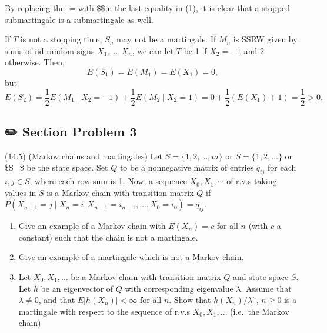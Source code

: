 \documentclass[
  letterpaper,
  DIV=11,
  numbers=noendperiod]{scrreprt}
\theoremstyle{definition}
\theoremstyle{plain}
\theoremstyle{remark}
\begin{document}
\begin{tcolorbox}[enhanced jigsaw, bottomrule=.15mm, opacityback=0, arc=.35mm, breakable, left=2mm, colframe=quarto-callout-tip-color-frame, toprule=.15mm, rightrule=.15mm, leftrule=.75mm, colback=white]
\begin{minipage}[t]{\textwidth - 5.5mm}
By replacing the \(\displaystyle =\)with \$\displaystyle \geq \$in the
last equality in (1), it is clear that a stopped submartingale is a
submartingale as well.

If \(\displaystyle T\) is not a stopping time, \(\displaystyle S_{n}\)
may not be a martingale. If \(\displaystyle M_{n}\) is SSRW given by
sums of iid random signs \(\displaystyle X_{1} ,\dotsc ,X_{n}\), we can
let \(\displaystyle T\) be 1 if \(\displaystyle X_{2} =-1\) and 2
otherwise. Then, \[
\begin{equation*}
E( S_{1}) =E( M_{1}) =E( X_{1}) =0,
\end{equation*}
\] but \[
\begin{equation*}
E( S_{2}) =\frac{1}{2} E( M_{1} \mid X_{2} =-1) +\frac{1}{2} E( M_{2} \mid X_{2} =1) =0+\frac{1}{2}( E( X_{1}) +1) =\frac{1}{2}  >0.
\end{equation*}
\]

\end{minipage}%
\end{tcolorbox}

\hypertarget{section-problem-3-6}{%
\subsection*{✏️ Section Problem 3}\label{section-problem-3-6}}

(14.5) (Markov chains and martingales) Let \(S=\{1,2,\dotsc ,m\}\) or
\(S=\{1,2,\dotsc \}\) or \$S=\ZZ \$ be the state space. Set \(Q\) to be
a nonnegative matrix of entries \(q_{ij}\) for each \(i,j\in S\), where
each row sum is 1. Now, a sequence \(X_{0} ,X_{1} ,\cdots\) of r.v.s
taking values in \(S\) is a Markov chain with transition matrix \(Q\) if
\(P(X_{n+1} =j\mid X_{n} =i,X_{n-1} =i_{n-1} ,\dotsc ,X_{0} =i_{0} )=q_{ij}\).

\begin{enumerate}
\def\labelenumi{(\alph{enumi})}
\item
  Give an example of a Markov chain with \(E(X_{n} )=c\) for all \(n\)
  (with \(c\) a constant) such that the chain is not a martingale.
\item
  Give an example of a martingale which is not a Markov chain.
\item
  Let \(X_{0} ,X_{1} ,\dotsc\) be a Markov chain with transition matrix
  \(Q\) and state space \(S\). Let \(h\) be an eigenvector of \(Q\) with
  corresponding eigenvalue \(\lambda\). Assume that \(\lambda \neq 0\),
  and that \(E|h(X_{n} )|< \infty\) for all \(n\). Show that
  \(h(X_{n} )/\lambda ^{n}\), \(n\geq 0\) is a martingale with respect
  to the sequence of r.v.s \(X_{0} ,X_{1} ,\dotsc\) (i.e.~the Markov
  chain)
\end{enumerate}
\end{document}
